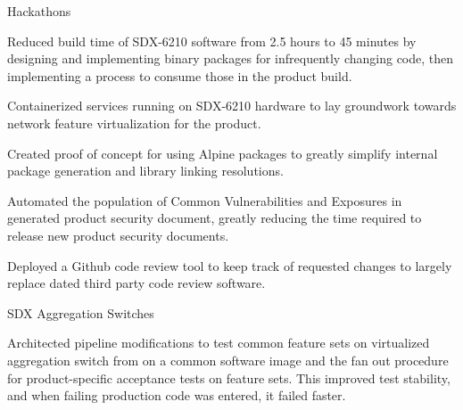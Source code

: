 
\begin{cventries}
  \cventry
    {
} {Hackathons} {} {} {
      \begin{cvitems}
          \item {Reduced build time of SDX-6210 software from 2.5 hours to 45 minutes by designing and implementing binary packages for infrequently changing code, then implementing a process to consume those in the product build.}
          \item {Containerized services running on SDX-6210 hardware to lay groundwork towards network feature virtualization for the product.}
          \item {Created proof of concept for using Alpine packages to greatly simplify internal package generation and library linking resolutions.}
          \item {Automated the population of Common Vulnerabilities and Exposures in generated product security document, greatly reducing the time required to release new product security documents.}
          \item {Deployed a Github code review tool to keep track of requested changes to largely replace dated third party code review software.}
      \end{cvitems}
    }

  \cventry
    {
} {SDX Aggregation Switches} {} {} {
      \begin{cvitems}
        \item {Architected pipeline modifications to test common feature sets on virtualized aggregation switch from on a common software image and the fan out procedure for product-specific acceptance tests on feature sets. This improved test stability, and when failing production code was entered, it failed faster.}
      \end{cvitems}
    }


\end{cventries}
